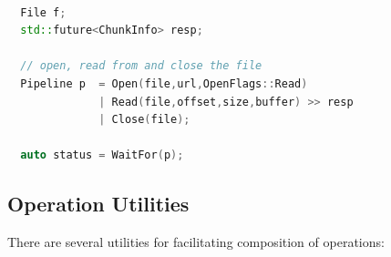 \documentclass{article}
\begin{document}
\begin{lstlisting}[language=C++]

  File f;
  std::future<ChunkInfo> resp;
  
  // open, read from and close the file
  Pipeline p  = Open(file,url,OpenFlags::Read)
              | Read(file,offset,size,buffer) >> resp 
              | Close(file);

  auto status = WaitFor(p);

\end{lstlisting}
	
	\subsection{Operation Utilities}
	
		There are several utilities for facilitating composition of operations:
		
\end{document}
